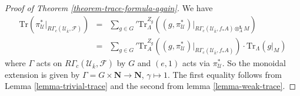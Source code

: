 \begin{proof}[Proof of Theorem \ref{theorem-trace-formula-again}]
\medskip\noindent
We have
\begin{eqnarray*}
\text{Tr}(
\pi_\mathcal{U}^*\big|_{R\Gamma_c(\mathcal{U}_{\bar k}, \mathcal{F})})
& = &
{\sum_{g \in G}}'
\text{Tr}_{\Lambda}^{Z_g}
\left(
(g, \pi_\mathcal{U}^*)
\big|_{R\Gamma_c(\mathcal{U}_{\bar k}, f_*A)\otimes_A^\mathbf{L} M}
\right) \\
& = &
{\sum_{g\in G}}'
\text{Tr}_A^{Z_g}
(
(g, \pi_\mathcal{U}^*)\big|_{R\Gamma_c(\mathcal{U}_{\bar k}, f_*A)}
)
\cdot
\text{Tr}_\Lambda(g|_M)
\end{eqnarray*}
where $\Gamma$ acts on $R\Gamma_c(\mathcal{U}_{\bar k}, \mathcal{F})$ by $G$
and $(e, 1)$ acts via $\pi_\mathcal{U}^*$. So the monoidal extension is given
by $\Gamma = G \times \mathbf{N} \to \mathbf{N}$, $\gamma \mapsto 1$. The first
equality follows from Lemma \ref{lemma-trivial-trace} and the second from lemma
\ref{lemma-weak-trace}.


\end{proof}
